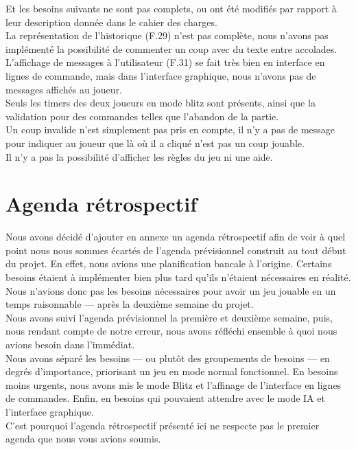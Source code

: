 \documentclass[a4paper,12pt]{article}
\begin{document}
Et les besoins suivants ne sont pas complets, ou ont été modifiés par rapport à
leur description donnée dans le cahier des charges.\\ La représentation de
l’historique (F.29) n’est pas complète, nous n’avons pas implémenté la
possibilité de commenter un coup avec du texte entre accolades.\\ L’affichage
de messages à l’utilisateur (F.31) se fait très bien en interface en lignes de
commande, mais dans l’interface graphique, nous n’avons pas de messages
affichés au joueur.\\ Seuls les timers des deux joueurs en mode blitz sont
présents, ainsi que la validation pour des commandes telles que l’abandon de la
partie.\\ Un coup invalide n’est simplement pas pris en compte, il n’y a pas de
message pour indiquer au joueur que là où il a cliqué n’est pas un coup
jouable.\\ Il n’y a pas la possibilité d’afficher les règles du jeu ni une
aide.\\

\newpage

\section{Agenda rétrospectif}

Nous avons décidé d’ajouter en annexe un agenda rétrospectif afin de voir à
quel point nous nous sommes écartés de l’agenda prévisionnel construit au tout
début du projet. En effet, nous avions une planification bancale à l’origine.
Certains besoins étaient à implémenter bien plus tard qu’ils n’étaient
nécessaires en réalité. Nous n’avions donc pas les besoins nécessaires pour
avoir un jeu jouable en un temps raisonnable — après la deuxième semaine du
projet.\\ Nous avons suivi l’agenda prévisionnel la première et deuxième
semaine, puis, nous rendant compte de notre erreur, nous avons réfléchi
ensemble à quoi nous avions besoin dans l’immédiat.\\ Nous avons séparé les
besoins — ou plutôt des groupements de besoins — en degrés d’importance,
priorisant un jeu en mode normal fonctionnel. En besoins moins urgents, nous
avons mis le mode Blitz et l’affinage de l’interface en lignes de commandes.
Enfin, en besoins qui pouvaient attendre avec le mode IA et l’interface
graphique.\\ C’est pourquoi l’agenda rétrospectif présenté ici ne respecte pas
le premier agenda que nous vous avions soumis.\\
\end{document}
